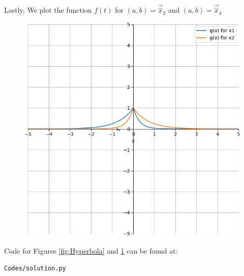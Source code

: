 \documentclass[journal]{IEEEtran}
\begin{document}
Lastly, We plot the function $f(t)$ for $(a, b) = \vec{\hat{x}}_2$ and $(a, b) = \vec{\hat{x}}_4$

\begin{figure}[H]
	\centering
	\includegraphics[width=0.75\columnwidth]{Figures/function.png} 
	\caption{}
	\label{fig:Function}
\end{figure} 

Code for Figures \ref{fig:Hyperbola} and \ref{fig:Function} can be found at:
\begin{lstlisting}
Codes/solution.py
\end{lstlisting}
\end{document}
